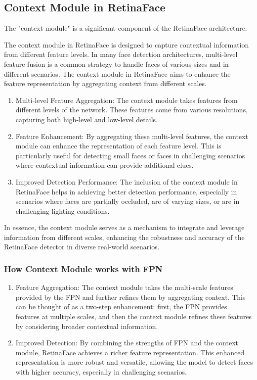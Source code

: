 \documentclass{article}
\begin{document}
\subsection{Context Module in RetinaFace}

The "context module" is a significant component of the RetinaFace architecture.

The context module in RetinaFace is designed to capture contextual information from different feature levels. In many face detection architectures, multi-level feature fusion is a common strategy to handle faces of various sizes and in different scenarios. The context module in RetinaFace aims to enhance the feature representation by aggregating context from different scales.

\begin{enumerate}
  \item Multi-level Feature Aggregation: The context module takes features from different levels of the network. These features come from various resolutions, capturing both high-level and low-level details.
  \item Feature Enhancement: By aggregating these multi-level features, the context module can enhance the representation of each feature level. This is particularly useful for detecting small faces or faces in challenging scenarios where contextual information can provide additional clues.
  \item Improved Detection Performance: The inclusion of the context module in RetinaFace helps in achieving better detection performance, especially in scenarios where faces are partially occluded, are of varying sizes, or are in challenging lighting conditions.
\end{enumerate}

In essence, the context module serves as a mechanism to integrate and leverage information from different scales, enhancing the robustness and accuracy of the RetinaFace detector in diverse real-world scenarios.

\subsubsection{How Context Module works with FPN}

\begin{enumerate}
  \item Feature Aggregation: The context module takes the multi-scale features provided by the FPN and further refines them by aggregating context. This can be thought of as a two-step enhancement: first, the FPN provides features at multiple scales, and then the context module refines these features by considering broader contextual information.
  \item Improved Detection: By combining the strengths of FPN and the context module, RetinaFace achieves a richer feature representation. This enhanced representation is more robust and versatile, allowing the model to detect faces with higher accuracy, especially in challenging scenarios.
\end{enumerate}
\end{document}
